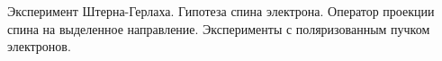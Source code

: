\documentclass[__main__.tex]{subfiles}
\begin{document}
Эксперимент Штерна-Герлаха. Гипотеза спина электрона. Оператор проекции спина на выделенное направление. Эксперименты с поляризованным пучком электронов.\\ 

\end{document}
